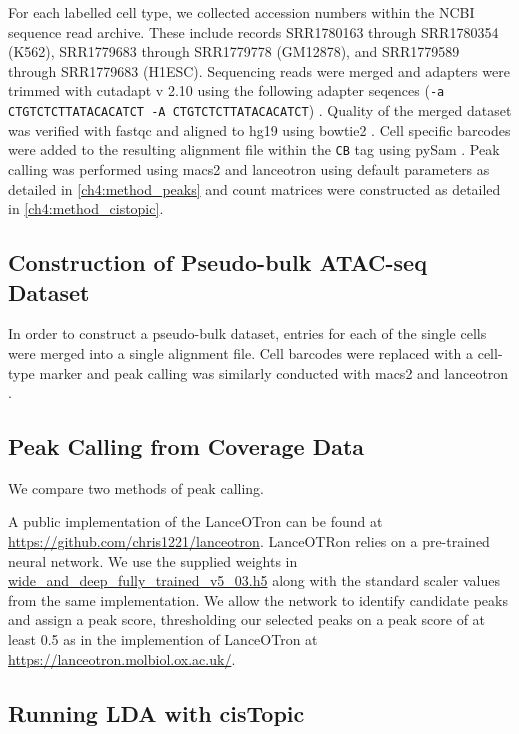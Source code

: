 For each labelled cell type, we collected accession numbers within the NCBI sequence read archive. These include records SRR1780163 through SRR1780354 (K562), SRR1779683 through SRR1779778 (GM12878), and SRR1779589 through SRR1779683 (H1ESC). Sequencing reads were merged and adapters were trimmed with cutadapt v 2.10 using the following adapter seqences ({\tt -a CTGTCTCTTATACACATCT -A CTGTCTCTTATACACATCT}) \cite{Martin2011}. Quality of the merged dataset was verified with fastqc and aligned to hg19 using bowtie2 \cite{Andrews2010, Langmead2013}. Cell specific barcodes were added to the resulting alignment file within the {\tt CB} tag using pySam \cite{Heger2009}. Peak calling was performed using macs2 and lanceotron using default parameters \cite{Gaspar2018, Hentges2021} as detailed in \autoref{ch4:method_peaks} and count matrices were constructed as detailed in \autoref{ch4:method_cistopic}.

\subsection{Construction of Pseudo-bulk ATAC-seq Dataset}

In order to construct a pseudo-bulk dataset, entries for each of the single cells were merged into a single alignment file. Cell barcodes were replaced with a cell-type marker and peak calling was similarly conducted with macs2 and lanceotron \cite{Gaspar2018, Hentges2021}.

\subsection{Peak Calling from Coverage Data} \label{ch4:method_peaks}

We compare two methods of peak calling.

A public implementation of the LanceOTron can be found at \url{https://github.com/chris1221/lanceotron}. LanceOTRon relies on a pre-trained neural network. We use the supplied weights in \url{wide_and_deep_fully_trained_v5_03.h5} along with the standard scaler values from the same implementation. We allow the network to identify candidate peaks and assign a peak score, thresholding our selected peaks on a peak score of at least 0.5 as in the implemention of LanceOTron at \url{https://lanceotron.molbiol.ox.ac.uk/}.


\subsection{Running LDA with cisTopic} \label{ch4:method_cistopic}


